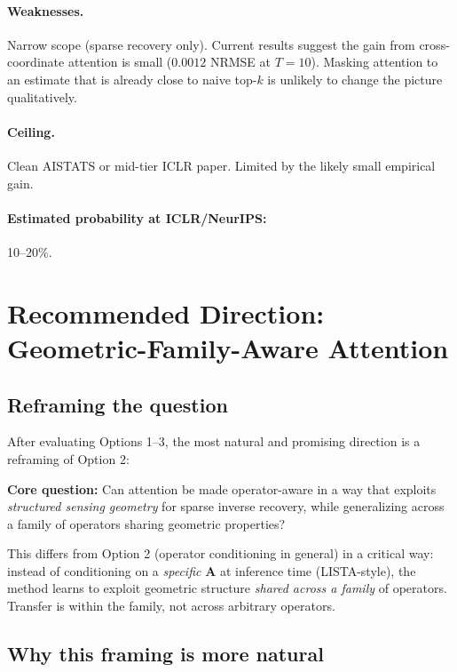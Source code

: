 \documentclass[11pt]{article}
\newcommand{\A}{\mathbf{A}}
\begin{document}
\paragraph{Weaknesses.}
Narrow scope (sparse recovery only).
Current results suggest the gain from cross-coordinate
attention is small ($0.0012$ NRMSE at $T=10$).
Masking attention to an estimate that is already close to
naive top-$k$ is unlikely to change the picture qualitatively.

\paragraph{Ceiling.}
Clean AISTATS or mid-tier ICLR paper. Limited by the
likely small empirical gain.

\paragraph{Estimated probability at ICLR/NeurIPS:} 10--20\%.

\section{Recommended Direction: Geometric-Family-Aware Attention}
\label{sec:recommended}

\subsection{Reframing the question}

After evaluating Options 1--3, the most natural and promising
direction is a reframing of Option 2:

\begin{mdframed}
\textbf{Core question:}
Can attention be made operator-aware in a way that exploits
\emph{structured sensing geometry} for sparse inverse recovery,
while generalizing across a family of operators sharing
geometric properties?
\end{mdframed}

This differs from Option 2 (operator conditioning in general)
in a critical way: instead of conditioning on a \emph{specific}
$\A$ at inference time (LISTA-style), the method learns to
exploit geometric structure \emph{shared across a family} of
operators. Transfer is within the family, not across arbitrary
operators.

\subsection{Why this framing is more natural}
\end{document}
